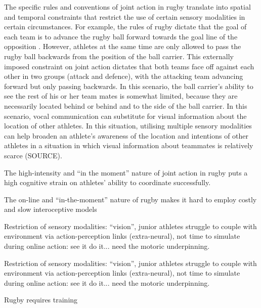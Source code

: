 \begin{CJK}{UTF8}{gbsn}
The specific rules and conventions of joint action in rugby translate into spatial and temporal constraints that restrict the use of certain sensory modalities in certain circumstances.  For example, the rules of rugby dictate that the goal of each team is to advance the rugby ball forward towards the goal line of the opposition \citep{IRB2014}. However, athletes at the same time are only allowed to pass the rugby ball backwards from the position of the ball carrier.  This externally imposed constraint on joint action dictates that both teams face off against each other in two groups (attack and defence), with the attacking team advancing forward but only passing backwards.  In this scenario, the ball carrier's ability to see the rest of his or her team mates is somewhat limited, because they are necessarily located behind or behind and to the side of the ball carrier.  In this scenario, vocal communication can substitute for visual information about the location of other athletes.  In this situation, utilising multiple sensory modalities can help broaden an athlete's awareness of the location and intentions of other athletes in a situation in which visual information about teammates is relatively scarce (SOURCE).




The high-intensity and ``in the moment'' nature of joint action in rugby puts a high cognitive strain on athletes' ability to coordinate successfully.

The on-line and ``in-the-moment'' nature of rugby makes it hard to employ costly and slow interoceptive models

Restriction of sensory modalities: ``vision'', junior athletes struggle to couple with environment via action-perception links (extra-neural), not time to simulate during online action: see it do it... need the motoric underpinning.

Restriction of sensory modalities: ``vision'', junior athletes struggle to couple with environment via action-perception links (extra-neural), not time to simulate during online action: see it do it... need the motoric underpinning.



Rugby requires training











\end{CJK}
